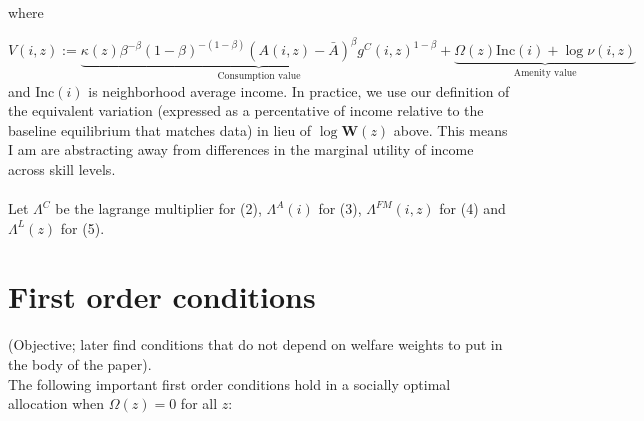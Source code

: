\documentclass[11pt]{article}
\begin{document}
	
	where
	
	\begin{equation*}
		V(i, z) := \underbrace{\kappa(z)\beta^{-\beta}(1-\beta)^{-(1-\beta)}(A(i, z) - \bar{A})^{\beta}g^{C}(i, z)^{1-\beta}}_{\text{Consumption value}} + \underbrace{\Omega(z)\text{Inc}(i) + \log\nu(i, z)}_{\text{Amenity value}}
	\end{equation*}
	and $\text{Inc}(i)$ is neighborhood average income. In practice, we use our definition of the equivalent variation (expressed as a percentative of income relative to the baseline equilibrium that matches data) in lieu of $\log \boldsymbol{W}(z)$ above. This means I am are abstracting away from differences in the marginal utility of income across skill levels. 
	
	\paragraph*{}
	Let $\Lambda^{C}$ be the lagrange multiplier for (2), $\Lambda^{A}(i)$ for (3), $\Lambda^{FM}(i, z)$ for (4) and $\Lambda^{L}(z)$ for (5). 
	
	
	
	
	\section{First order conditions}
	(Objective; later find conditions that do not depend on welfare weights to put in the body of the paper). \\
	
	The following important first order conditions hold in a socially optimal allocation when $\Omega(z) = 0$ for all $z$:
	
\end{document}
